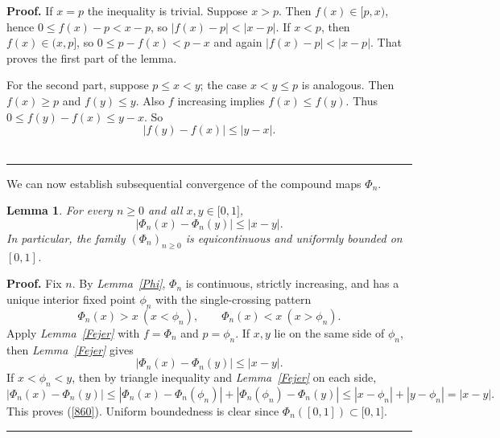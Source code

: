 \documentclass[onecolumn]{article}
\newtheorem{lemma}[theorem]{Lemma}
\newenvironment{proof}[1][Proof]{\noindent\textbf{#1.} }{\ \rule{0.5em}{0.5em}}
\begin{document}
\begin{proof}
\noindent If $x=p$ the inequality is trivial. Suppose $x>p$. Then $f(x)\in
\lbrack p,x)$, hence $0\leq f(x)-p<x-p$, so $|f(x)-p|<|x-p|$. If $x<p$, then 
$f(x)\in (x,p]$, so $0\leq p-f(x)<p-x$ and again $|f(x)-p|<|x-p|$. That
proves the first part of the lemma.

For the second part, suppose $p\leq x<y$; the case $x<y\leq p$ is analogous.
Then $f(x)\geq p$ and $f(y)\leq y$. Also $f$ increasing implies $f(x)\leq
f(y)$. Thus $0\leq f(y)-f(x)\leq y-x$. So 
\begin{equation}
|f(y)-f(x)|\leq |y-x|.  \label{546.1}
\end{equation}
\end{proof}

We can now establish subsequential convergence of the compound maps $\Phi
_{n}$.

\begin{lemma}
\label{Phi-1Lip} For every $n\geq 0$ and all $x,y\in \lbrack 0,1]$, 
\begin{equation}
|\Phi _{n}(x)-\Phi _{n}(y)|\leq |x-y|.  \label{860}
\end{equation}%
In particular, the family $(\Phi _{n})_{n\geq 0}$ is equicontinuous and
uniformly bounded on $[0,1]$.
\end{lemma}

\begin{proof}
Fix $n$. By \textit{Lemma~\ref{Phi}}, $\Phi _{n}$ is continuous, strictly
increasing, and has a unique interior fixed point $\phi _{n}$ with the
single-crossing pattern 
\begin{equation}
\Phi _{n}(x)>x\ (x<\phi _{n}),\qquad \Phi _{n}(x)<x\ (x>\phi _{n}).
\label{861}
\end{equation}%
Apply \textit{Lemma~\ref{Fejer}} with $f=\Phi _{n}$ and $p=\phi _{n}$. If $%
x,y$ lie on the same side of $\phi _{n}$, then \textit{Lemma~\ref{Fejer} }%
gives 
\begin{equation}
|\Phi _{n}(x)-\Phi _{n}(y)|\leq |x-y|.  \label{870}
\end{equation}%
If $x<\phi _{n}<y$, then by triangle inequality and \textit{Lemma~\ref{Fejer}
}on each side, 
\begin{equation}
|\Phi _{n}(x)-\Phi _{n}(y)|\leq |\Phi _{n}(x)-\Phi _{n}(\phi _{n})|+|\Phi
_{n}(\phi _{n})-\Phi _{n}(y)|\leq |x-\phi _{n}|+|y-\phi _{n}|=|x-y|.
\label{871}
\end{equation}%
This proves (\ref{860}). Uniform boundedness is clear since $\Phi
_{n}([0,1])\subset \lbrack 0,1]$. \medskip
\end{proof}
\end{document}
